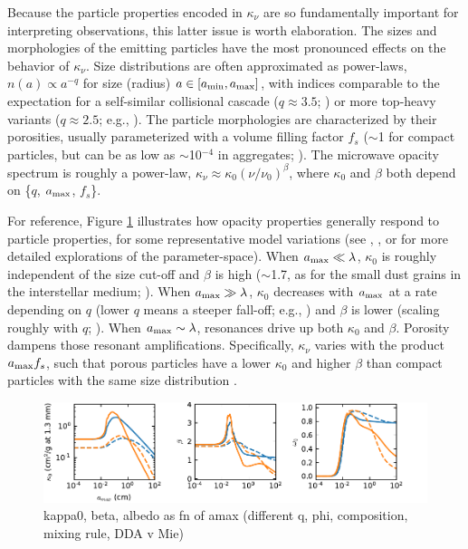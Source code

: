 \documentclass[a4paper]{ar-1col}
\begin{document}
Because the particle properties encoded in $\kappa_\nu$ are so fundamentally important for interpreting observations, this latter issue is worth elaboration.  The sizes and morphologies of the emitting particles have the most pronounced effects on the behavior of $\kappa_\nu$.  Size distributions are often approximated as power-laws, $n(a) \propto a^{-q}$ for size (radius) $a \in [a_{\rm min}, a_{\rm max}]$, with indices comparable to the expectation for a self-similar collisional cascade ($q \approx 3.5$; \citealt{dohnanyi69,tanaka96}) or more top-heavy variants ($q \approx 2.5$; e.g., \citealt{birnstiel11}).  The particle morphologies are characterized by their porosities, usually parameterized with a volume filling factor $f_s$ ($\sim$1 for compact particles, but can be as low as $\sim$10$^{-4}$ in aggregates; \citealt{kataoka13}).  The microwave opacity spectrum is roughly a power-law, $\kappa_\nu \approx \kappa_0 (\nu/\nu_0)^\beta$, where $\kappa_0$ and $\beta$ both depend on \{$q$, $a_{\rm max}$, $f_s$\}.  

For reference, Figure \ref{fig:opac} illustrates how opacity properties generally respond to particle properties, for some representative model variations (see \citealt{cuzzi14}, \citealt{woitke16}, or \citealt{dsharp5} for more detailed explorations of the parameter-space). When $a_{\rm max} \ll \lambda$, $\kappa_0$ is roughly independent of the size cut-off and $\beta$ is high ($\sim$1.7, as for the small dust grains in the interstellar medium; \citealt{finkbeiner99}).  When $a_{\rm max} \gg \lambda$, $\kappa_0$ decreases with $a_{\rm max}$ at a rate depending on $q$ (lower $q$ means a steeper fall-off; e.g., \citealt{ricci10a}) and $\beta$ is lower (scaling roughly with $q$; \citealt{draine06}).  When $a_{\rm max} \sim \lambda$, resonances drive up both $\kappa_0$ and $\beta$.  Porosity dampens those resonant amplifications.  Specifically, $\kappa_\nu$ varies with the product $a_{\rm max} f_s$, such that porous particles have a lower $\kappa_0$ and higher $\beta$ than compact particles with the same size distribution \citep{kataoka14}.  

\begin{figure}[t]
\includegraphics[width=\textwidth]{opac_pars.pdf}
\caption{kappa0, beta, albedo as fn of amax (different q, phi, composition, mixing rule, DDA v Mie)}
\label{fig:opac}
\end{figure}
\end{document}
